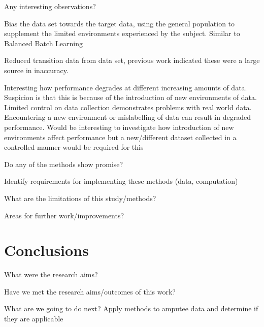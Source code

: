 Any interesting observations?

Bias the data set towards the target data, using the general population to supplement the limited environments experienced by the subject. Similar to Balanced Batch Learning \cite{Cruciani2020}

Reduced transition data from data set, previous work indicated these were a large source in inaccuracy.

Interesting how performance degrades at different increasing amounts of data. Suspicion is that this is because of the introduction of new environments of data. Limited control on data collection demonstrates problems with real world data. Encountering a new environment or mislabelling of data can result in degraded performance. Would be interesting to investigate how introduction of new environments affect performance but a new/different dataset collected in a controlled manner would be required for this

Do any of the methods show promise?

Identify requirements for implementing these methods (data, computation)

What are the limitations of this study/methods?

Areas for further work/improvements?

\section{Conclusions}
\label{sec:personalisation-conclusions}
What were the research aims?

Have we met the research aims/outcomes of this work?

What are we going to do next? Apply methods to amputee data and determine if they are applicable